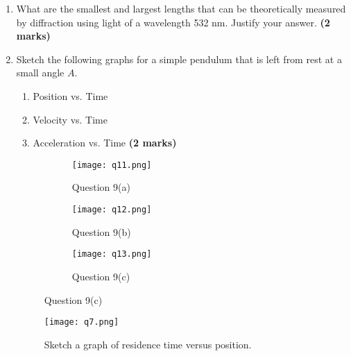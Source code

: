 \begin{enumerate}
\item What are the smallest and largest lengths that can be theoretically measured by diffraction using light of a wavelength 532 nm. Justify your answer. \hfill \textbf{(2 marks)}






\item Sketch the following graphs for a simple pendulum that is left from rest at a small angle $A$.

\begin{enumerate}
\item Position vs. Time
\item Velocity vs. Time 
\item Acceleration vs. Time \hfill \textbf{(2 marks)}
\end{enumerate} 

\begin{figure}[!htb]
\centering
\begin{subfigure}[b]{0.5\textwidth}
\centering
\texttt{[image: q11.png]}
\caption{Question 9(a)}
\end{subfigure}%
\begin{subfigure}[b]{0.5\textwidth}
\centering
\texttt{[image: q12.png]}
\caption{Question 9(b)}
\end{subfigure}
\begin{subfigure}[b]{0.5\textwidth}
\centering
\texttt{[image: q13.png]}
\caption{Question 9(c)}
\end{subfigure}
\end{figure}



\begin{figure}[!htb]
\centering
\texttt{[image: q7.png]}
\caption{Sketch a graph of residence time versus position.}
\label{resGraph}
\end{figure}


\end{enumerate}
